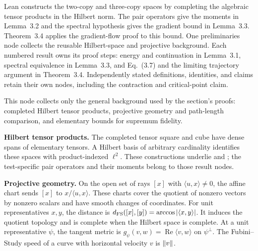 Lean constructs the two-copy and three-copy spaces by completing the
algebraic tensor products in the Hilbert norm. The pair operators give the
moments in Lemma~3.2 and the spectral hypothesis gives the gradient bound
in Lemma~3.3. Theorem~3.4 applies the gradient-flow proof to this bound.
One preliminaries node collects the reusable Hilbert-space and projective
background. Each numbered result owns its proof steps: energy and continuation
in Lemma~3.1, spectral equivalence in Lemma~3.3, and Eq.~(3.7) and the limiting
trajectory argument in Theorem~3.4. Independently stated definitions, identities,
and claims retain their own nodes, including the contraction and critical-point claim.

\begin{lemma}\label{prelim:flow}
  \leanok
  \par
  This node collects only the general background used by the section's proofs:
  completed Hilbert tensor products, projective geometry and path-length
  comparison, and elementary bounds for supremum fidelity.

  \textbf{Hilbert tensor products.}
  The completed tensor square and cube have dense spans of elementary tensors.
  A Hilbert basis of arbitrary cardinality identifies these spaces with
  product-indexed $\ell^2$. These constructions underlie
   and ;
  the test-specific pair operators and their moments belong to those result nodes.

  \textbf{Projective geometry.}
  On the open set of rays $[x]$ with $\langle u,x\rangle\ne0$, the affine
  chart sends $[x]$ to $x/\langle u,x\rangle$. These charts cover the
  quotient of nonzero vectors by nonzero scalars and have smooth changes of
  coordinates. For unit representatives $x,y$, the distance is
  $d_{\rm FS}([x],[y])=\arccos|\langle x,y\rangle|$. It induces the quotient
  topology and is complete when the Hilbert space is complete.
  At a unit representative $\psi$, the tangent metric is
  $g_\psi(v,w)=\operatorname{Re}\langle v,w\rangle$ on $\psi^\perp$.
  The Fubini--Study speed of a curve with horizontal velocity $v$ is $\lVert v \rVert$.


\end{lemma}
